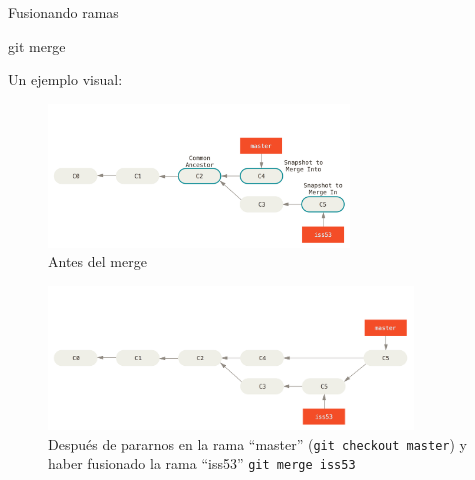 \begin{frame}[t]{Fusionando ramas}
    \begin{comando}
        git merge
    \end{comando}

    \pause

    \pause
    Un ejemplo visual:
     {
    	\begin{figure}[ht]
    		\begin{center}
    			\includegraphics[height=1.5in]{images/merge-1.png}
    		\end{center}
    		\caption{Antes del merge}
    	\end{figure}
    }
     {
        \begin{figure}[ht]
    		\begin{center}
    			\includegraphics[height=1.5in]{images/merge-2.png}
    		\end{center}
    		\caption{Después de pararnos en la rama ``master'' (\texttt{git checkout master}) y haber fusionado la rama ``iss53'' \texttt{git merge iss53}}
    	\end{figure}
    }
\end{frame}

